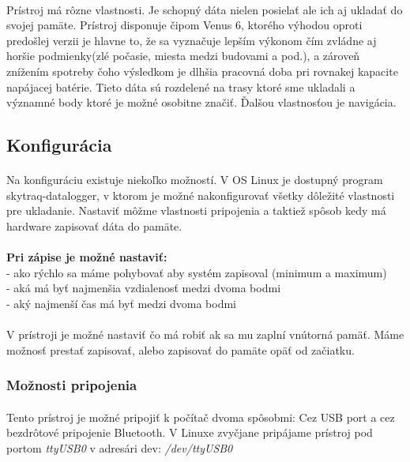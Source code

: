 \paragraph{}
Prístroj má rôzne vlastnosti. Je schopný dáta nielen posielať ale ich aj ukladať
do svojej pamäte. Prístroj disponuje čipom Venus 6, ktorého výhodou oproti predošlej verzii je hlavne to, že sa vyznačuje lepším výkonom čím zvládne aj horšie podmienky(zlé počasie, miesta medzi budovami a pod.), a zároveň znížením spotreby čoho výsledkom je dlhšia pracovná doba pri rovnakej kapacite napájacej batérie. Tieto dáta sú rozdelené na trasy ktoré sme ukladali a významné body ktoré je možné osobitne značiť. Ďalšou vlastnosťou je navigácia. 
\subsection{Konfigurácia}
\paragraph{}
Na konfiguráciu existuje niekoľko možností. V OS Linux je dostupný program
skytraq-datalogger, v ktorom je možné nakonfigurovať všetky dôležité vlastnosti pre ukladanie. Nastaviť môžme vlastnosti pripojenia a taktiež spôsob kedy má hardware zapisovať dáta do pamäte.\\\\
\textbf{Pri zápise je možné nastaviť: } \\
- ako rýchlo sa máme pohybovať aby systém zapisoval (minimum a maximum)\\
- aká má byť najmenšia vzdialenosť medzi dvoma bodmi\\
- aký najmenší čas má byť medzi dvoma bodmi
\paragraph{}V prístroji je možné nastaviť čo má robiť ak sa mu zaplní vnútorná pamäť. Máme možnosť prestať zapisovať, alebo zapisovať do pamäte opäť od začiatku.

\subsubsection{Možnosti pripojenia}
\paragraph{}
Tento prístroj je možné pripojiť k počítač dvoma spôsobmi: Cez USB port a cez
bezdrôtové pripojenie Bluetooth.
V Linuxe zvyčjane pripájame prístroj pod portom \textit{ttyUSB0} v adresári dev:  \textit{/dev/ttyUSB0}

